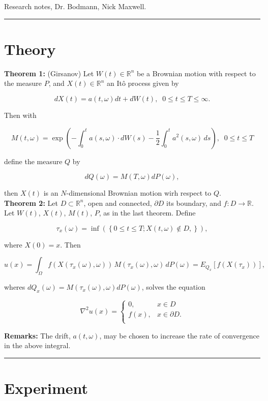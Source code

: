 \documentclass[12pt]{article}
\newcommand{\reals}[0] { \mathbb{R}}
\newcommand{\om}[0] { \omega }
\newcommand{\Om}[0] { \Omega }
\newcommand{\rarw}[0] { \rightarrow }
\begin{document}
Research notes, Dr. Bodmann, Nick Maxwell.

\addvspace{5pt} \hrule

\section*{Theory}

{\bf Theorem 1:} (Girsanov) Let $W(t) \in \reals^n$ be a Brownian motion with respect to the measure $P$,  and $X(t) \in \reals^n$ an It\^o process given by 

$$
dX(t) = a(t,\om) dt + dW(t), \; \; 0 \le t \le T \le \infty.
$$

\noindent
Then with

$$
M(t, \om ) = \exp \left( - \int_0^t a(s,\om) \cdot dW(s) - \frac{1}{2} \int_0^t a^2(s,\om) \, ds  \right), \; \; 0 \le t \le T
$$

\noindent
define the measure $Q$ by 

$$
dQ(\om) = M(T, \om) dP(\om),
$$

\noindent
then $X(t)$ is an $N$-dimensional Brownian motion wirh respect to $Q$. \\



{\bf Theorem 2:} Let $D \subset \reals^n$, open and connected, $\partial D$ its boundary, and $f: D \rarw \reals$. Let $W(t)$, $X(t)$, $M(t)$, $P$, as in the last theorem. Define

$$
\tau_{x}(\om) = \inf \left( \left\{  0 \le t \le T;  X(t, \om) \not \in D,  \right\} \right),
$$

\noindent
where $X(0) = x$. Then

$$
u(x) = \int_\Om f ( X(\tau_x(\om), \om) ) \, M(\tau_x(\om), \om) \,  dP(\om) = E_{Q_x} [ f(X(\tau_x)) ],
$$

\noindent
wheres $dQ_x(\om) = M(\tau_x(\om), \om) dP(\om)$, solves the equation 

$$
\nabla^2 u(x) = \left \{ \begin{array}{cc} 
0, & x \in D \\
f(x), & x \in \partial D. \\
\end{array} \right.
$$

{\bf Remarks:}
The drift, $a(t,\om)$, may be chosen to increase the rate of convergence in the above integral.



\addvspace{5pt} \hrule

\section*{Experiment}
\end{document}
